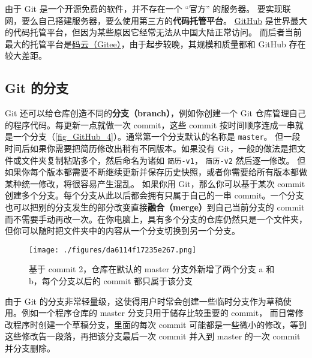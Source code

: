 由于 Git 是一个开源免费的软件，并不存在一个 “官方” 的服务器。 要实现联网，要么自己搭建服务器，要么使用第三方的\textbf{代码托管平台}。 \href{https://github.com/}{GitHub} 是世界最大的代码托管平台，但因为某些原因它经常无法从中国大陆正常访问。 而后者当前最大的托管平台是\href{https://gitee.com/}{码云（Gitee）}，由于起步较晚，其规模和质量都和 GitHub 存在较大差距。


\subsection{Git 的分支}
Git 还可以给仓库创造不同的\textbf{分支（branch）}，例如你创建一个 Git 仓库管理自己的程序代码。每更新一点就做一次 commit，这些 commit 按时间顺序连成一串就是一个分支（\autoref{fig_GitHub_4}）。通常第一个分支默认的名称是 \verb`master`。 但一段时间后如果你需要把简历修改出稍有不同版本。如果没有 Git，一般的做法是把文件或文件夹复制粘贴多个，然后命名为诸如 \verb`简历-v1`， \verb`简历-v2` 然后逐一修改。 但如果你每个版本都需要不断继续更新并保存历史快照，或者你需要给所有版本都做某种统一修改，将很容易产生混乱。 如果你用 Git，那么你可以基于某次 commit 创建多个分支。每个分支从此以后都会拥有只属于自己的一串 commit。一个分支也可以把别的分支发生的部分改变直接\textbf{融合（merge）}到自己当前分支的 commit 而不需要手动再改一次。在你电脑上，具有多个分支的仓库仍然只是一个文件夹，但你可以随时把文件夹中的内容从一个分支切换到另一个分支。

\begin{figure}[ht]
\centering
\texttt{[image: ./figures/da6114f17235e267.png]}
\caption{基于 commit 2，仓库在默认的 master 分支外新增了两个分支 a 和 b，每个分支以后的 commit 都只属于该分支} \label{fig_GitHub_4}
\end{figure}

由于 Git 的分支非常轻量级，这使得用户时常会创建一些临时分支作为草稿使用。例如一个程序仓库的 master 分支只用于储存比较重要的 commit， 而日常修改程序时创建一个草稿分支，里面的每次 commit 可能都是一些微小的修改，等到这些修改告一段落，再把该分支最后一次 commit 并入到 master 的一次 commit 并分支删除。

